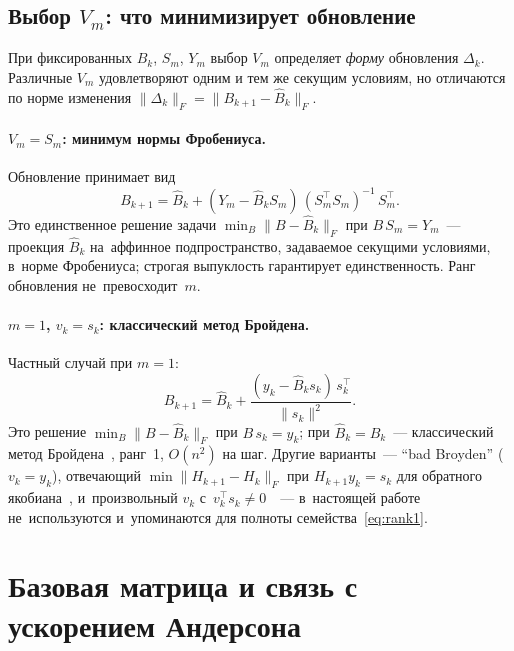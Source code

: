 \subsection*{Выбор $V_m$: что минимизирует обновление}

При фиксированных $\widehat{B}_k$, $S_m$, $Y_m$ выбор $V_m$ определяет
\emph{форму} обновления $\Delta_k$. Различные $V_m$ удовлетворяют
одним и тем же секущим условиям, но отличаются по норме изменения
$\|\Delta_k\|_F = \|B_{k+1} - \widehat{B}_k\|_F$.

\paragraph{$V_m = S_m$: минимум нормы Фробениуса.}
Обновление принимает вид
\begin{equation}\label{eq:Vm_Sm}
  B_{k+1} = \widehat{B}_k + (Y_m - \widehat{B}_k S_m)\,(S_m^\top S_m)^{-1}\,S_m^\top.
\end{equation}
Это единственное решение задачи $\min_{B}\|B - \widehat{B}_k\|_F$
при $B\,S_m = Y_m$~--- проекция $\widehat{B}_k$ на~аффинное подпространство,
задаваемое секущими условиями, в~норме Фробениуса; строгая выпуклость
гарантирует единственность. Ранг обновления не~превосходит~$m$.

\paragraph{$m=1$, $v_k = s_k$: классический метод Бройдена.}
Частный случай при $m=1$:
\begin{equation}\label{eq:good_broyden}
  B_{k+1} = \widehat{B}_k + \frac{(y_k - \widehat{B}_k s_k)\,s_k^\top}{\|s_k\|^2}.
\end{equation}
Это решение $\min_B \|B - \widehat{B}_k\|_F$ при $B\,s_k = y_k$;
при $\widehat{B}_k = B_k$~--- классический метод
Бройдена~\cite{broyden1965}, ранг~1, $O(n^2)$ на шаг. Другие
варианты~--- ``bad Broyden'' ($v_k=y_k$), отвечающий
$\min\|H_{k+1}-H_k\|_F$ при $H_{k+1} y_k=s_k$ для обратного
якобиана~\cite{broyden1965,dennis1996}, и~произвольный $v_k$
с~$v_k^\top s_k\ne 0$~\cite{gay1979}~--- в~настоящей работе
не~используются и~упоминаются для полноты семейства~\eqref{eq:rank1}.


\section{Базовая матрица и связь с ускорением Андерсона}\label{sec:ch1_base}

